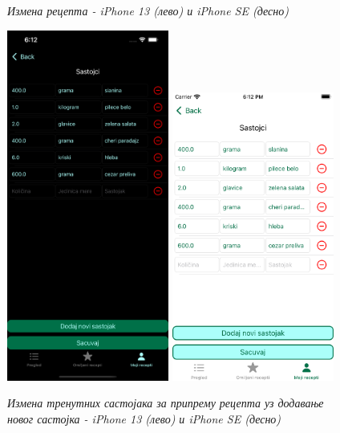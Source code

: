 \documentclass[12pt,oneside]{memoir}
\begin{document}
\begin{figure} [H]
    \caption{\textit{Измена рецепта - iPhone 13 (лево) и iPhone SE (десно)}}
    \label{slika:измена_рецепта_1}
\end{figure}

\begin{figure} [H]
    \centering
    \captionsetup{justification=centering}
    \includegraphics[width=0.475\textwidth]{images/simulators/view images/dark - ingredients2.png}
    \hfill
    \includegraphics[width=0.475\textwidth]{images/simulators/view images/light - ingredients2.png}
    \caption{\textit{Измена тренутних састојака за припрему рецепта уз додавање новог састојка - iPhone 13 (лево) и iPhone SE (десно)}}
    \label{slika:измена_састојака_2_1}
\end{figure}
\end{document}
